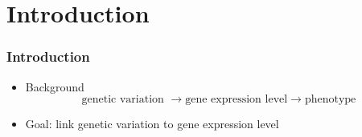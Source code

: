 \section{Introduction}
\begin{frame}
\sectionpage
\end{frame}

\begin{frame}
    \frametitle{Introduction}
    \begin{itemize}
      \item Background 
      \begin{equation*}
        \text{genetic variation } \rightarrow
        \text{gene expression level} \rightarrow
        \text{phenotype} 
      \end{equation*}


%      
\item Goal: link genetic variation to gene expression level

    \end{itemize}
\end{frame}

